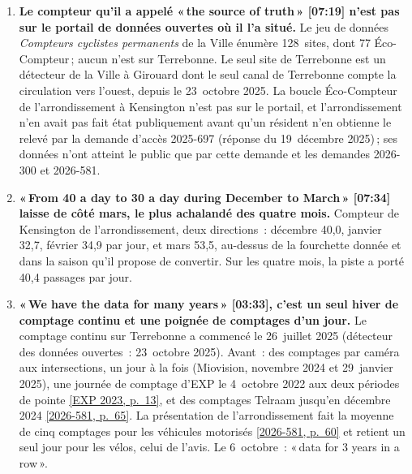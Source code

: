 \documentclass[11pt,letterpaper]{article}
\newcommand{\repourl}{https://github.com/OpenMobilityData/Terrebonne-open-sources}
\newcommand{\pagesurl}{https://openmobilitydata.github.io/Terrebonne-access-requests}
\newcommand{\cliptime}[1]{\textsf{\small[#1]}}
\newcommand{\pgl}[2]{\href{\pagesurl/2026-581/raw/01_emails_mandate_counts.pdf\#page=#1}{\textsf{\small[2026-581, p.~#2]}}}
\newcommand{\pg}[1]{\pgl{#1}{#1}}
\newcommand{\exppg}[1]{\href{\repourl/blob/main/2023-exp-mobility-study/raw/EXP_Etude_de_mobilite_rue_de_Terrebonne_2023.pdf}{\textsf{\small[EXP 2023, p.~#1]}}}
\begin{document}
\begin{enumerate}[nosep]
  \item \begin{minipage}[t]{\linewidth}\textbf{Le compteur qu'il a appelé «\,the source of truth\,» \cliptime{07:19} n'est pas sur le portail de données ouvertes où il l'a situé.} Le jeu de données \emph{Compteurs cyclistes permanents} de la Ville énumère 128~sites, dont 77 Éco-Compteur\,; aucun n'est sur Terrebonne. Le seul site de Terrebonne est un détecteur de la Ville à Girouard dont le seul canal de Terrebonne compte la circulation vers l'ouest, depuis le 23~octobre 2025. La boucle Éco-Compteur de l'arrondissement à Kensington n'est pas sur le portail, et l'arrondissement n'en avait pas fait état publiquement avant qu'un résident n'en obtienne le relevé par la demande d'accès 2025-697 (réponse du 19~décembre 2025)\,; ses données n'ont atteint le public que par cette demande et les demandes 2026-300 et 2026-581.\end{minipage}\vspace{0.35em}
  \item \begin{minipage}[t]{\linewidth}\textbf{«\,From 40 a day to 30 a day during December to March\,» \cliptime{07:34} laisse de côté mars, le plus achalandé des quatre mois.} Compteur de Kensington de l'arrondissement, deux directions~: décembre 40{,}0, janvier 32{,}7, février 34{,}9 par jour, et mars 53{,}5, au-dessus de la fourchette donnée et dans la saison qu'il propose de convertir. Sur les quatre mois, la piste a porté 40{,}4 passages par jour.\end{minipage}\vspace{0.35em}
  \item \begin{minipage}[t]{\linewidth}\textbf{«\,We have the data for many years\,» \cliptime{03:33}, c'est un seul hiver de comptage continu et une poignée de comptages d'un jour.} Le comptage continu sur Terrebonne a commencé le 26~juillet 2025 (détecteur des données ouvertes~: 23~octobre 2025). Avant~: des comptages par caméra aux intersections, un jour à la fois (Miovision, novembre 2024 et 29~janvier 2025), une journée de comptage d'EXP le 4~octobre 2022 aux deux périodes de pointe \exppg{13}, et des comptages Telraam jusqu'en décembre 2024 \pg{65}. La présentation de l'arrondissement fait la moyenne de cinq comptages pour les véhicules motorisés \pg{60} et retient un seul jour pour les vélos, celui de l'avis. Le 6~octobre~: «\,data for 3 years in a row\,».\end{minipage}\vspace{0.35em}

\end{enumerate}
\end{document}
